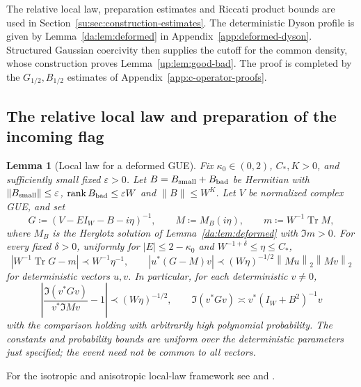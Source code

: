 \documentclass[11pt]{article}
\numberwithin{equation}{section}
\newtheorem{lemma}[theorem]{Lemma}
\theoremstyle{remark}
\newcommand{\Tr}{\operatorname{Tr}}
\newcommand{\rank}{\operatorname{rank}}
\newcommand{\norm}[1]{\left\|#1\right\|}
\begin{document}
The relative local law, preparation estimates and Riccati product bounds
are used in Section~\ref{su:sec:construction-estimates}. The deterministic
Dyson profile is given by Lemma~\ref{da:lem:deformed} in
Appendix~\ref{app:deformed-dyson}. Structured
Gaussian coercivity then supplies the cutoff for the common density,
whose construction proves Lemma~\ref{up:lem:good-bad}. The proof
is completed by the $G_{1/2},B_{1/2}$ estimates of
Appendix~\ref{app:c-operator-proofs}.

\subsection{The relative local law and preparation of the incoming flag}
\label{app:relative-local-law-proof}
\label{su:sec:spectral-proofs}

\begin{lemma}[Local law for a deformed GUE]\label{us:lem:local-law}
Fix $\kappa_0\in(0,2)$, $C_*,K>0$, and sufficiently small fixed
$\varepsilon>0$. Let $B=B_{\rm small}+B_{\rm bad}$ be Hermitian with
$\|B_{\rm small}\|\le\varepsilon$, $\rank B_{\rm bad}\le\varepsilon W$
and $\|B\|\le W^K$. Let $V$ be normalized complex
GUE, and set
\[
 G\coloneqq(V-EI_W-B-i\eta)^{-1},\qquad
 M\coloneqq M_B(i\eta),\qquad m\coloneqq W^{-1}\Tr M,
\]
where $M_B$ is the Herglotz solution of Lemma~\ref{da:lem:deformed}
with $\Im m>0$.
For every fixed $\delta>0$, uniformly for
$|E|\le2-\kappa_0$ and $W^{-1+\delta}\le\eta\le C_*$,
\begin{equation}\label{us:eq:weighted-local-law}
 \left|W^{-1}\Tr G-m\right|\prec W^{-1}\eta^{-1},\qquad
 |u^*(G-M)v|\prec
 (W\eta)^{-1/2} \norm{Mu}_2\norm{Mv}_2
\end{equation}
for deterministic vectors $u,v$. In particular, for each deterministic
$v\ne0$,
\begin{equation}\label{us:eq:relative-local-law}
 \left|\frac{\Im(v^*Gv)}{v^*\Im Mv}-1\right|
 \prec(W\eta)^{-1/2},\qquad
 \Im(v^*Gv)\asymp v^*(I_W+B^2)^{-1}v
\end{equation}
with the comparison holding with arbitrarily high polynomial probability.
The constants and probability bounds are uniform over the deterministic
parameters just specified; the event need not be common to all vectors.
\end{lemma}

For the isotropic and anisotropic local-law framework see \cite{KYiso}
and \cite[Section~12, Theorem~12.2]{KYani}.
\end{document}
